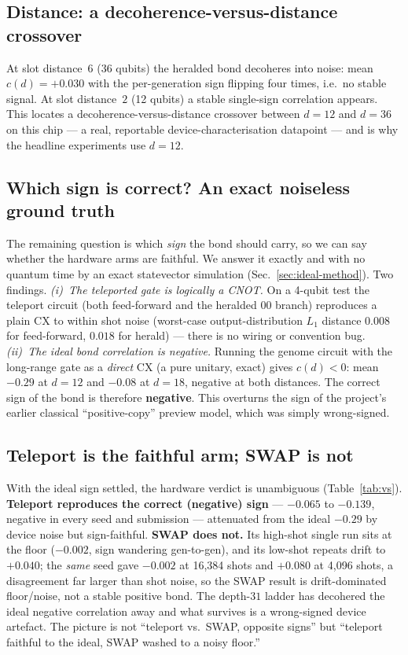 \documentclass[conference]{IEEEtran}
\begin{document}
\subsection{Distance: a decoherence-versus-distance crossover}

At slot distance~$6$ (36 qubits) the heralded bond decoheres into noise: mean
$c(d){=}+0.030$ with the per-generation sign flipping four times, i.e.\ no stable signal.
At slot distance~$2$ (12 qubits) a stable single-sign correlation appears. This locates a
decoherence-versus-distance crossover between $d{=}12$ and $d{=}36$ on this chip --- a real,
reportable device-characterisation datapoint --- and is why the headline experiments use
$d{=}12$.

\subsection{Which sign is correct? An exact noiseless ground truth}
\label{sec:ideal}

The remaining question is which \emph{sign} the bond should carry, so we can say whether
the hardware arms are faithful. We answer it exactly and with no quantum time by an exact
statevector simulation (Sec.~\ref{sec:ideal-method}). Two findings.
\emph{(i)~The teleported gate is logically a CNOT.} On a 4-qubit test the teleport circuit
(both feed-forward and the heralded $00$ branch) reproduces a plain $\mathrm{CX}$ to within
shot noise (worst-case output-distribution $L_1$ distance $0.008$ for feed-forward, $0.018$
for herald) --- there is no wiring or convention bug. \emph{(ii)~The ideal bond correlation
is negative.} Running the genome circuit with the long-range gate as a \emph{direct}
$\mathrm{CX}$ (a pure unitary, exact) gives $c(d){<}0$: mean $-0.29$ at $d{=}12$ and $-0.08$
at $d{=}18$, negative at both distances. The correct sign of the bond is therefore
\textbf{negative}. This overturns the sign of the project's earlier classical
``positive-copy'' preview model, which was simply wrong-signed.

\subsection{Teleport is the faithful arm; SWAP is not}

With the ideal sign settled, the hardware verdict is unambiguous (Table~\ref{tab:vs}).
\textbf{Teleport reproduces the correct (negative) sign} --- $-0.065$ to $-0.139$, negative
in every seed and submission --- attenuated from the ideal $-0.29$ by device noise but
sign-faithful. \textbf{SWAP does not.} Its high-shot single run sits at the floor
($-0.002$, sign wandering gen-to-gen), and its low-shot repeats drift to $+0.040$; the
\emph{same} seed gave $-0.002$ at 16{,}384 shots and $+0.080$ at 4{,}096 shots, a
disagreement far larger than shot noise, so the SWAP result is drift-dominated
floor/noise, not a stable positive bond. The depth-$31$ ladder has decohered the ideal
negative correlation away and what survives is a wrong-signed device artefact. The picture
is not ``teleport vs.\ SWAP, opposite signs'' but ``teleport faithful to the ideal, SWAP
washed to a noisy floor.''
\end{document}
